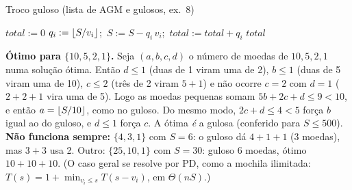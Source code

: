 \begin{pseudo}{Troco guloso (lista de AGM e gulosos, ex.~8)}
\begin{algorithmic}
 
  \State $total:=0$
    \State $q_i:=\lfloor S/v_i\rfloor$;\ $S:=S-q_i\,v_i$;\ $total:=total+q_i$ 
  \EndFor
  \State \Return $total$ 
\EndFunction
\end{algorithmic}
\end{pseudo}
\textbf{Ótimo para $\{10,5,2,1\}$.} Seja $(a,b,c,d)$ o número de moedas de $10,5,2,1$ numa solução ótima. Então $d\le1$ (duas de 1 viram uma de 2), $b\le1$ (duas de 5 viram uma de 10), $c\le2$ (três de 2 viram $5+1$) e não ocorre $c=2$ com $d=1$ ($2+2+1$ vira uma de 5). Logo as moedas pequenas somam $5b+2c+d\le9<10$, e então $a=\lfloor S/10\rfloor$, como no guloso. Do mesmo modo, $2c+d\le4<5$ força $b$ igual ao do guloso, e $d\le1$ força $c$. A ótima \emph{é} a gulosa (conferido para $S\le500$).
\textbf{Não funciona sempre:} $\{4,3,1\}$ com $S=6$: o guloso dá $4+1+1$ (3 moedas), mas $3+3$ usa 2. Outro: $\{25,10,1\}$ com $S=30$: guloso 6 moedas, ótimo $10+10+10$. (O caso geral se resolve por PD, como a mochila ilimitada: $T(s)=1+\min_{v_i\le s}T(s-v_i)$, em $\Theta(nS)$.)

